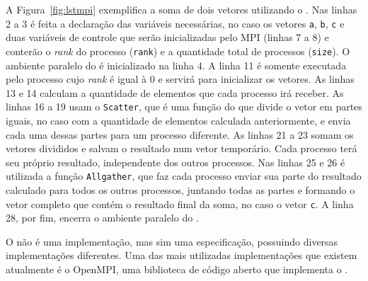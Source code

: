 A Figura~\ref{fig:lstmpi} exemplifica a soma de dois vetores utilizando o \mpi. Nas linhas 2 a 3 é feita a declaração das variáveis necessárias, no caso os vetores \texttt{a}, \texttt{b}, \texttt{c} e duas variáveis de controle que serão inicializadas pelo MPI (linhas 7 a 8) e conterão o \textit{rank} do processo \mpi (\texttt{rank}) e a quantidade total de processos \mpi (\texttt{size}). O ambiente paralelo do \mpi é inicializado na linha 4. A linha 11 é somente executada pelo processo \mpi cujo \textit{rank} é igual à 0 e servirá para inicializar os vetores. As linhas 13 e 14 calculam a quantidade de elementos que cada processo irá receber. As linhas 16 a 19 usam o \texttt{Scatter}, que é uma função do \mpi que divide o vetor em partes iguais, no caso com a quantidade de elementos calculada anteriormente, e envia cada uma dessas partes para um processo diferente. As linhas 21 a 23 somam os vetores divididos e salvam o resultado num vetor temporário. Cada processo terá seu próprio resultado, independente dos outros processos. Nas linhas 25 e 26 é utilizada a função \texttt{Allgather}, que faz cada processo enviar sua parte do resultado calculado para todos os outros processos, juntando todas as partes e formando o vetor completo que contém o resultado final da soma, no caso o vetor \texttt{c}. A linha 28, por fim, encerra o ambiente paralelo do \mpi.

O \mpi não é uma implementação, mas sim uma especificação, possuindo diversas implementações diferentes. Uma das mais utilizadas implementações que existem atualmente é o OpenMPI, uma biblioteca de código aberto que implementa o \mpi \cite{Gropp1999}.

